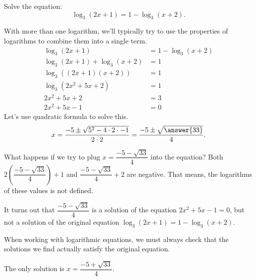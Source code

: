 \documentclass{ximera}
\begin{document}
\begin{example}
	Solve the equation: \[ \log_3(2x+1) = 1-\log_3(x+2). \]
	\begin{explanation}
		With more than one logarithm, we'll typically try to use the properties of logarithms to combine them into a single term.
		\begin{align*}
			\log_3(2x+1) &= 1-\log_3(x+2) \\
			\log_3(2x+1) + \log_3(x+2) &= 1\\
			\log_3\left( (2x+1)(x+2)\right) &= 1\\
			\log_3\left( 2x^2 + 5x + 2 \right) &= 1\\
			2x^2 + 5x + 2 &= 3\\
			2x^2 + 5x - 1 &= 0
		\end{align*}
		Let's use quadratic formula to solve this.
		\[ x = \frac{-5 \pm \sqrt{5^2 - 4 \cdot 2\cdot -1}}{2 \cdot 2} = \frac{ -5\pm \sqrt{ \answer{33} } }{4}. \]
		
		What happens if we try to plug $x = \dfrac{-5 - \sqrt{33}}{4}$ into the equation?  Both $2\left( \dfrac{-5-\sqrt{33}}{4} \right) + 1$ and $\dfrac{-5-\sqrt{33}}{4} + 2$ are 
		negative.  That means, the logarithms of these values is not defined.  
		
		It turns out that $\dfrac{-5 - \sqrt{33}}{4}$ is a solution of the equation $2x^2+5x-1 = 0$,
		but not a solution of the original equation $\log_3(2x+1) = 1-\log_3(x+2)$. 
		
		When working with logarithmic equations, we must always check that the solutions we find 
		actually satisfy the original equation.
		
		The only solution is $x = \dfrac{-5 + \sqrt{33}}{4}$.
		
	\end{explanation}		
\end{example}
\end{document}
